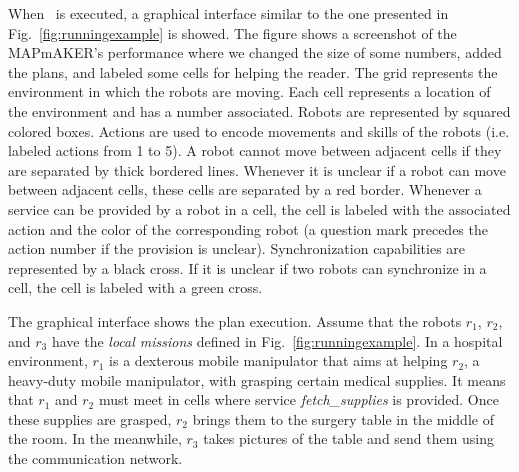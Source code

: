 When  \toolName\ is executed, a graphical interface similar to the one presented  in Fig.~\ref{fig:runningexample} is showed.
The figure shows a screenshot of the MAPmAKER's performance where we changed the size of some numbers, added the plans, and labeled some cells for helping the reader.
The grid represents the environment in which the robots are moving.
Each cell represents a location of the environment and has a number associated. %
Robots are represented by squared colored boxes.
Actions are used to encode movements %
and skills of the robots (i.e. labeled actions from 1 to 5).
A robot  cannot move between adjacent cells if they are separated by thick bordered lines.
Whenever  it is unclear if a robot can move between adjacent cells, these cells are separated by a red border.
Whenever a service can be provided by a robot in a cell, the cell is labeled with the associated action and the color of the corresponding robot (a question mark precedes the action number if the provision is unclear).
Synchronization capabilities are represented by a black cross.
If it is unclear if two robots can synchronize in a cell, the cell is labeled with a green cross.

The graphical interface shows the plan execution.
Assume that the robots $r_1$, $r_2$, and $r_3$ have the \emph{local missions} defined in Fig.~\ref{fig:runningexample}.
In a  hospital environment, $r_1$ is a dexterous mobile manipulator that aims at helping $r_2$, a heavy-duty mobile manipulator, with grasping certain medical supplies.
It means that $r_1$ and $r_2$ must meet in cells where service \emph{fetch\_supplies} is provided.
Once these supplies are grasped, $r_2$ brings them to the surgery table in the middle of the room.
In the meanwhile, $r_3$ takes pictures of the table and send them using the communication network.


